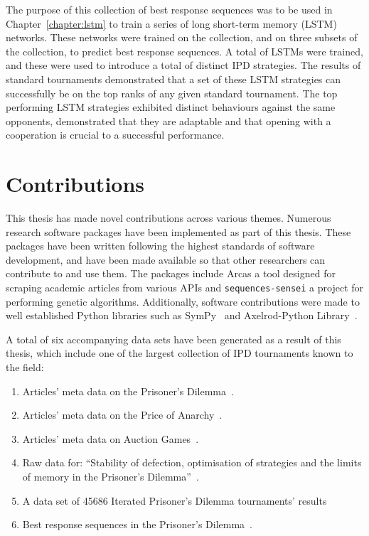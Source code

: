 The purpose of this collection of best response sequences
was to be used in Chapter~\ref{chapter:lstm} to train a series of long short-term
memory (LSTM) networks. These networks were trained on the collection, and on
three subsets of the collection, to predict best response sequences. A total
of \lstmnetworks LSTMs were trained, and these were used to introduce a total of \lstmstrategies
distinct IPD strategies. The results of \metatournamentslstm standard
tournaments demonstrated that a set of these LSTM strategies can successfully be
on the top ranks of any given standard tournament. The top performing LSTM
strategies exhibited distinct behaviours against the same opponents,
demonstrated that they are adaptable and that opening with a cooperation is crucial
to a successful performance.

\section{Contributions}

This thesis has made novel contributions across various themes. Numerous
research software packages have been implemented as part of this thesis. These
packages have been written following the highest standards of software
development, and have been made available so that other researchers can
contribute to and use them. The packages include Arcas a tool designed for
scraping academic articles from various APIs and
\texttt{sequences-sensei} a project for performing genetic
algorithms. Additionally, software contributions were made to well established
Python libraries such as SymPy~\cite{sympy} and Axelrod-Python
Library~\cite{axelrodproject}.

A total of six accompanying data sets have been generated as a result of this thesis,
which include one of the largest collection of IPD
tournaments known to the field:

\begin{enumerate}
    \item Articles' meta data on the Prisoner's Dilemma~\cite{pd_data_2018}.
    \item Articles' meta data on the Price of Anarchy~\cite{anarchy_data_2018}.
    \item Articles' meta data on Auction Games~\cite{auction_data_2018}.
    \item Raw data for: ``Stability of defection, optimisation of strategies and
    the limits of memory in the Prisoner's Dilemma''~\cite{glynatsi2019}.
    \item A data set of 45686 Iterated Prisoner's Dilemma tournaments' results~\cite{Glynatsi2019_meta, Glynatsi2019_meta_raw_data}
    \item Best response sequences in the Prisoner's Dilemma~\cite{Glynatsi2020_sequences}.
\end{enumerate}

